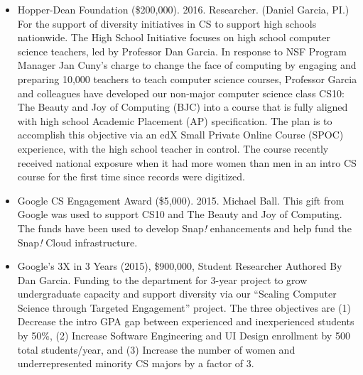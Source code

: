 \begin{itemize}
    \item{Hopper-Dean Foundation (\$200,000). 2016. Researcher. (Daniel Garcia, PI.)}
    \newline\small{For the support of diversity initiatives in CS to support high schools nationwide. The High School Initiative focuses on high school computer science teachers, led by Professor Dan Garcia. In response to NSF Program Manager Jan Cuny’s charge to change the face of computing by engaging and preparing 10,000 teachers to teach computer science courses, Professor Garcia and colleagues have developed our non-major computer science class CS10: The Beauty and Joy of Computing (BJC) into a course that is fully aligned with high school Academic Placement (AP) specification. The plan is to accomplish this objective via an edX Small Private Online Course (SPOC) experience, with the high school teacher in control. The course recently received national exposure when it had more women than men in an intro CS course for the first time since records were digitized.}

    \item{Google CS Engagement Award (\$5,000). 2015. Michael Ball.}
    \newline\small{This gift from Google was used to support CS10 and The Beauty and Joy of Computing. The funds have been used to develop Snap\textit{!} enhancements and help fund the Snap\textit{!} Cloud infrastructure.}
    
    \item{Google’s 3X in 3 Years (2015), \$900,000, Student  Researcher
    Authored By Dan Garcia. Funding to the department for 3-year project to grow undergraduate capacity and support diversity via our “Scaling Computer Science through Targeted Engagement” project. The three objectives are (1) Decrease the intro GPA gap between experienced and inexperienced students by 50\%, (2) Increase Software Engineering and UI Design enrollment by 500 total students/year, and (3) Increase the number of women and underrepresented minority CS majors by a factor of 3.}
    

\end{itemize}
